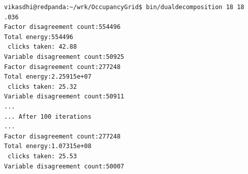 \documentclass[10pt,oneside,letterpaper]{article}
\begin{document}
\begin{lstlisting}
vikasdhi@redpanda:~/wrk/OccupancyGrid$ bin/dualdecomposition 18 18 .036
Factor disagreement count:554496
Total energy:554496
 clicks taken: 42.88
Variable disagreement count:50925
Factor disagreement count:277248
Total energy:2.25915e+07
 clicks taken: 25.32
Variable disagreement count:50911
...
... After 100 iterations
...
Factor disagreement count:277248
Total energy:1.07315e+08
 clicks taken: 25.53
Variable disagreement count:50007
\end{lstlisting}




\end{document}
